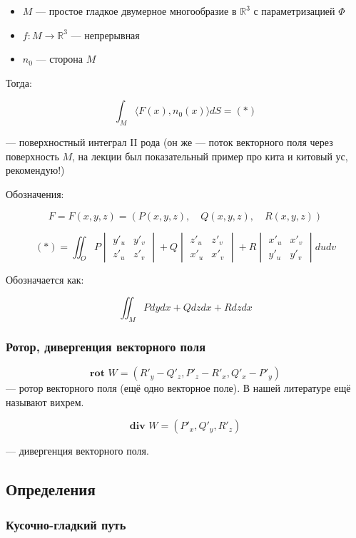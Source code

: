 \documentclass{article}
\def\sk#1#2{\langle #1, #2 \rangle}
\begin{document}
\begin{itemize}
    \item $M$ --- простое гладкое двумерное многообразие в $\mathbb{R}^3$ с параметризацией $\Phi$
    \item $f: M \rightarrow \mathbb{R}^3$ --- непрерывная
    \item $n_0$ --- сторона $M$
\end{itemize}

Тогда:

\[\int_{M} \sk{F(x)}{n_0(x)} dS = (*)\]

--- поверхностный интеграл II рода (он же --- поток векторного поля через поверхность $M$, на лекции был показательный пример про кита и китовый ус,  рекомендую!)

Обозначения:

\[F = F(x, y, z) = (P(x, y, z), \quad Q(x, y, z), \quad R(x, y, z))\]

\[(*) = \iint_{O} P \begin{vmatrix}
    y'_u & y'_v \\
    z'_u & z'_v
 \end{vmatrix} + Q\begin{vmatrix}
    z'_u & z'_v \\
    x'_u & x'_v
 \end{vmatrix} + R \begin{vmatrix}
    x'_u & x'_v \\
    y'_u & y'_v
\end{vmatrix} dudv\]

Обозначается как:

\[\iint_{M} P dydx + Q dzdx + R dzdx\]
\subsubsection{Ротор, дивергенция векторного поля}

\[\textbf{rot } W = (R'_y - Q'_z, P'_z - R'_x, Q'_x - P'_y)\] --- ротор векторного поля (ещё одно векторное поле). В нашей литературе ещё называют вихрем.

\[\textbf{div } W = (P'_x, Q'_y, R'_z)\]

--- дивергенция векторного поля.

\newpage

\subsection{Определения}

\subsubsection{Кусочно-гладкий путь}
\end{document}
